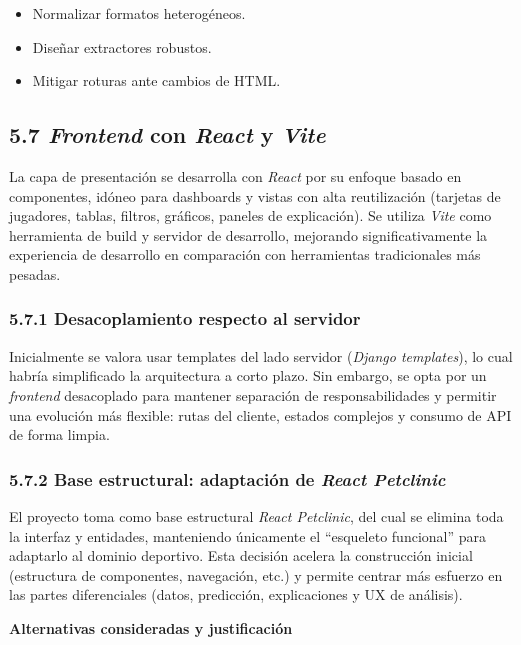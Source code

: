 \begin{itemize}
\item Normalizar formatos heterogéneos.
\item Diseñar extractores robustos.
\item Mitigar roturas ante cambios de HTML.
\end{itemize}

\subsection{5.7 \textit{Frontend} con \textit{React} y \textit{Vite}}

La capa de presentación se desarrolla con \textit{React} por su enfoque basado en componentes, idóneo para 
dashboards y vistas con alta reutilización (tarjetas de jugadores, tablas, filtros, gráficos, 
paneles de explicación). Se utiliza \textit{Vite} como herramienta de build y servidor de desarrollo, 
mejorando significativamente la experiencia de desarrollo en comparación con herramientas 
tradicionales más pesadas.

\subsubsection{5.7.1 Desacoplamiento respecto al servidor}

Inicialmente se valora usar templates del lado servidor (\textit{Django templates}), lo cual habría 
simplificado la arquitectura a corto plazo. Sin embargo, se opta por un \textit{frontend} desacoplado para 
mantener separación de responsabilidades y permitir una evolución más flexible: rutas del cliente, 
estados complejos y consumo de API de forma limpia.

\subsubsection{5.7.2 Base estructural: adaptación de \textit{React Petclinic}}

El proyecto toma como base estructural \textit{React Petclinic}, del cual se elimina toda la interfaz y 
entidades, manteniendo únicamente el ``esqueleto funcional'' para adaptarlo al dominio deportivo. 
Esta decisión acelera la construcción inicial (estructura de componentes, navegación, etc.) y permite 
centrar más esfuerzo en las partes diferenciales (datos, predicción, explicaciones y UX de análisis).

\textbf{Alternativas consideradas y justificación}

